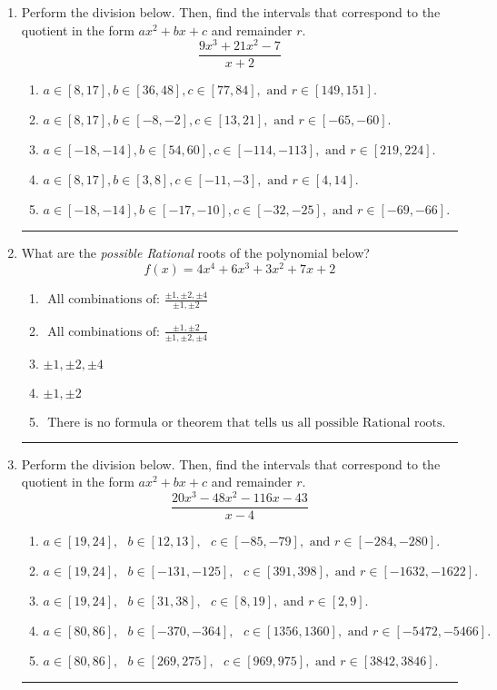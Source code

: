 \documentclass[14pt]{extbook}
\newcommand{\litem}[1]{\item#1\hspace*{-1cm}\rule{\textwidth}{0.4pt}}
\begin{document}
\begin{enumerate}
\litem{
Perform the division below. Then, find the intervals that correspond to the quotient in the form $ax^2+bx+c$ and remainder $r$.\[ \frac{9x^{3} +21 x^{2} -7}{x + 2} \]\begin{enumerate}[label=\Alph*.]
\item \( a \in [8, 17], b \in [36, 48], c \in [77, 84], \text{ and } r \in [149, 151]. \)
\item \( a \in [8, 17], b \in [-8, -2], c \in [13, 21], \text{ and } r \in [-65, -60]. \)
\item \( a \in [-18, -14], b \in [54, 60], c \in [-114, -113], \text{ and } r \in [219, 224]. \)
\item \( a \in [8, 17], b \in [3, 8], c \in [-11, -3], \text{ and } r \in [4, 14]. \)
\item \( a \in [-18, -14], b \in [-17, -10], c \in [-32, -25], \text{ and } r \in [-69, -66]. \)

\end{enumerate} }
\litem{
What are the \textit{possible Rational} roots of the polynomial below?\[ f(x) = 4x^{4} +6 x^{3} +3 x^{2} +7 x + 2 \]\begin{enumerate}[label=\Alph*.]
\item \( \text{ All combinations of: }\frac{\pm 1,\pm 2,\pm 4}{\pm 1,\pm 2} \)
\item \( \text{ All combinations of: }\frac{\pm 1,\pm 2}{\pm 1,\pm 2,\pm 4} \)
\item \( \pm 1,\pm 2,\pm 4 \)
\item \( \pm 1,\pm 2 \)
\item \( \text{ There is no formula or theorem that tells us all possible Rational roots.} \)

\end{enumerate} }
\litem{
Perform the division below. Then, find the intervals that correspond to the quotient in the form $ax^2+bx+c$ and remainder $r$.\[ \frac{20x^{3} -48 x^{2} -116 x -43}{x -4} \]\begin{enumerate}[label=\Alph*.]
\item \( a \in [19, 24], \text{   } b \in [12, 13], \text{   } c \in [-85, -79], \text{   and   } r \in [-284, -280]. \)
\item \( a \in [19, 24], \text{   } b \in [-131, -125], \text{   } c \in [391, 398], \text{   and   } r \in [-1632, -1622]. \)
\item \( a \in [19, 24], \text{   } b \in [31, 38], \text{   } c \in [8, 19], \text{   and   } r \in [2, 9]. \)
\item \( a \in [80, 86], \text{   } b \in [-370, -364], \text{   } c \in [1356, 1360], \text{   and   } r \in [-5472, -5466]. \)
\item \( a \in [80, 86], \text{   } b \in [269, 275], \text{   } c \in [969, 975], \text{   and   } r \in [3842, 3846]. \)


\end{enumerate}}
\end{enumerate}
\end{document}
